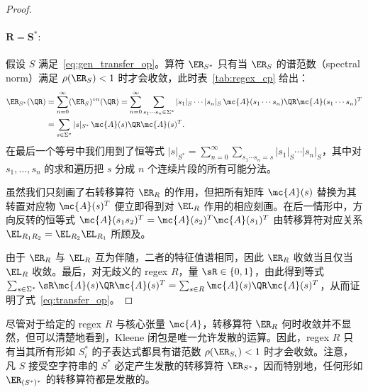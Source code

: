 \begin{proof}
\paragraph{$\mathbf{R = S^*:}$} 假设 $S$ 满足~\eqref{eq:gen_transfer_op}。算符 $\ER_{S^*}$ 只有当 $\ER_S$ 的谱范数（spectral norm）满足 $\rho(\ER_S) < 1$ 时才会收敛，此时表~\ref{tab:regex_cp}
给出：
%
\begin{align*}
    \ER_{S^*}(\QR) &= \sum_{n=0}^\infty (\ER_{S})^{\circ n}(\QR) = \sum_{n=0}^\infty \sum_{s_1\cdots s_n \in \Sigma^*} |s_1|_{S} \cdots |s_n|_S\, \mc{A}(s_1 \cdots s_n) \QR \mc{A}(s_1 \cdots s_n)^T \\
    &= \sum_{s \in \Sigma^*} |s|_{S^*}\, \mc{A}(s) \QR \mc{A}(s)^T.
\end{align*}
%
在最后一个等号中我们用到了恒等式 $|s|_{S^*} = \sum_{n=0}^\infty \sum_{s_1 \cdots s_n = s} |s_1|_{S} \cdots |s_n|_{S}$，其中对 $s_1, \ldots, s_n$ 的求和遍历把 $s$ 分成 $n$ 个连续片段的所有可能分法。

虽然我们只刻画了右转移算符 $\ER_R$ 的作用，但把所有矩阵 $\mc{A}(s)$ 替换为其转置对应物 $\mc{A}(s)^T$ 便立即得到对 $\EL_R$ 作用的相应刻画。在后一情形中，方向反转的恒等式 $\mc{A}(s_1 s_2)^T = \mc{A}(s_2)^T \mc{A}(s_1)^T$ 由转移算符对应关系 $\EL_{R_1 R_2} = \EL_{R_2}\EL_{R_1}$ 所顾及。

由于 $\ER_R$ 与 $\EL_R$ 互为伴随，二者的特征值谱相同，因此 $\ER_R$ 收敛当且仅当 $\EL_R$ 收敛。最后，对无歧义的 regex $R$，量 $\sR \in \{0, 1\}$，由此得到等式 $\sum_{s\in \Sigma^*} \sR \mc{A}(s) \QR \mc{A}(s)^T = \sum_{s\in R} \mc{A}(s) \QR \mc{A}(s)^T$，从而证明了式~\ref{eq:transfer_op}。

\end{proof}

尽管对于给定的 regex $R$ 与核心张量 $\mc{A}$，转移算符 $\ER_R$ 何时收敛并不显然，但可以清楚地看到，Kleene 闭包是唯一允许发散的运算。因此，regex $R$ 只有当其所有形如 $S_i^*$ 的子表达式都具有谱范数 $\rho(\ER_{S_i}) < 1$ 时才会收敛。注意，凡 $S$ 接受空字符串的 $S^*$ 必定产生发散的转移算符 $\ER_{S^*}$，因而特别地，任何形如 $\ER_{(S^*)^*}$ 的转移算符都是发散的。

